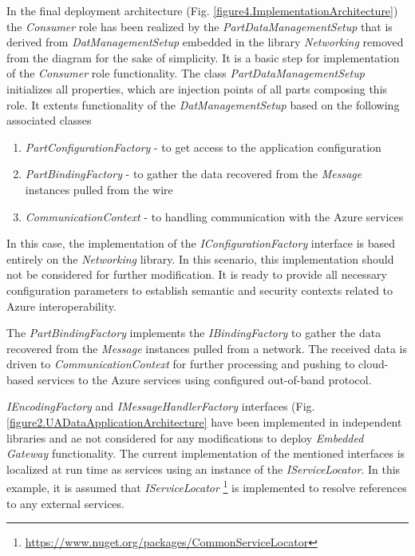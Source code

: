 \documentclass{jacsart}
\begin{document}
In the final deployment architecture (Fig. \ref*{figure4.ImplementationArchitecture}) the \textit{Consumer} role has been realized by the \textit{PartDataManagementSetup} that is derived from \textit{DatManagementSetup} embedded in the library \textit{Networking} removed from the diagram for the sake of simplicity. It is a basic step for implementation of the \textit{Consumer} role functionality. The class \textit{PartDataManagementSetup} initializes all properties, which are injection points of all parts composing this role. It extents functionality of the \textit{DatManagementSetup} based on the following associated classes

\begin{enumerate}
      \item \textit{PartConfigurationFactory} - to get access to the application configuration
      \item \textit{PartBindingFactory} - to gather the data recovered from the \textit{Message} instances pulled from the wire
      \item \textit{CommunicationContext} - to handling communication with the Azure services
\end{enumerate}

In this case, the implementation of the \textit{IConfigurationFactory} interface is based entirely on the \textit{Networking} library. In this scenario, this implementation should not be considered for further modification. It is ready to provide all necessary configuration parameters to establish semantic and security contexts related to Azure interoperability.

The \textit{PartBindingFactory} implements the \textit{IBindingFactory} to gather the data recovered from the \emph{Message} instances pulled from a network. The received data is driven to \textit{CommunicationContext} for further processing and pushing to cloud-based services to the Azure services using configured out-of-band protocol.

\textit{IEncodingFactory} and \textit{IMessageHandlerFactory} interfaces (Fig. \ref*{figure2.UADataApplicationArchitecture} have been implemented in independent libraries and ae not considered for any modifications to deploy \textit{Embedded Gateway} functionality. The current implementation of the mentioned interfaces is localized at run time as services using an instance of the \textit{IServiceLocator}. In this example, it is assumed that \textit{IServiceLocator} \footnote{ \url{https://www.nuget.org/packages/CommonServiceLocator} } is implemented to resolve references to any external services.
\end{document}
